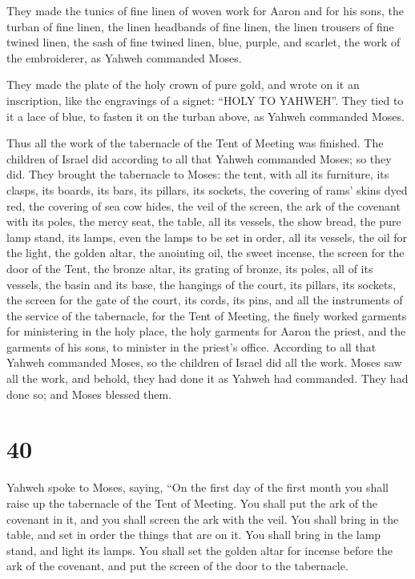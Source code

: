  They made the tunics of fine linen of woven work for Aaron
and for his sons,  the turban of fine linen, the linen
headbands of fine linen, the linen trousers of fine twined linen,
 the sash of fine twined linen, blue, purple, and scarlet,
the work of the embroiderer, as Yahweh commanded Moses.

 They made the plate of the holy crown of pure gold, and
wrote on it an inscription, like the engravings of a signet: ``HOLY TO
YAHWEH''.  They tied to it a lace of blue, to fasten it on
the turban above, as Yahweh commanded Moses.

 Thus all the work of the tabernacle of the Tent of Meeting
was finished. The children of Israel did according to all that Yahweh
commanded Moses; so they did.  They brought the tabernacle
to Moses: the tent, with all its furniture, its clasps, its boards, its
bars, its pillars, its sockets,  the covering of rams'
skins dyed red, the covering of sea cow hides, the veil of the screen,
 the ark of the covenant with its poles, the mercy seat,
 the table, all its vessels, the show bread, 
the pure lamp stand, its lamps, even the lamps to be set in order, all
its vessels, the oil for the light,  the golden altar, the
anointing oil, the sweet incense, the screen for the door of the Tent,
 the bronze altar, its grating of bronze, its poles, all of
its vessels, the basin and its base,  the hangings of the
court, its pillars, its sockets, the screen for the gate of the court,
its cords, its pins, and all the instruments of the service of the
tabernacle, for the Tent of Meeting,  the finely worked
garments for ministering in the holy place, the holy garments for Aaron
the priest, and the garments of his sons, to minister in the priest's
office.  According to all that Yahweh commanded Moses, so
the children of Israel did all the work.  Moses saw all the
work, and behold, they had done it as Yahweh had commanded. They had
done so; and Moses blessed them.

\hypertarget{section-39}{%
\section{40}\label{section-39}}

 Yahweh spoke to Moses, saying,  ``On the first
day of the first month you shall raise up the tabernacle of the Tent of
Meeting.  You shall put the ark of the covenant in it, and
you shall screen the ark with the veil.  You shall bring in
the table, and set in order the things that are on it. You shall bring
in the lamp stand, and light its lamps.  You shall set the
golden altar for incense before the ark of the covenant, and put the
screen of the door to the tabernacle.

